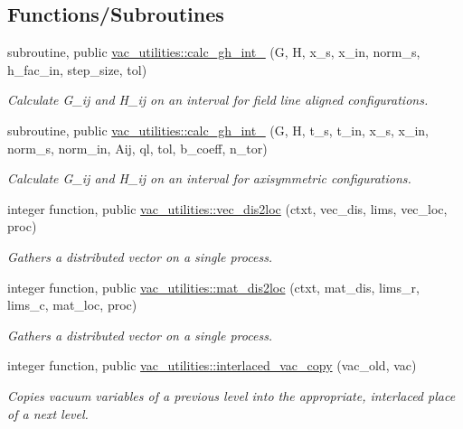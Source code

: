 \subsection*{Functions/\+Subroutines}
\begin{DoxyCompactItemize}
\item 
subroutine, public \hyperlink{namespacevac__utilities_aa8859980354d180445ed0437d7f51bcd}{vac\+\_\+utilities\+::calc\+\_\+gh\+\_\+int\+\_} (G, H, x\+\_\+s, x\+\_\+in, norm\+\_\+s, h\+\_\+fac\+\_\+in, step\+\_\+size, tol)
\begin{DoxyCompactList}\small\item\em Calculate G\+\_\+ij and H\+\_\+ij on an interval for field line aligned configurations. \end{DoxyCompactList}\item 
subroutine, public \hyperlink{namespacevac__utilities_af387fcaa54ec681e55d6eb685ad622bd}{vac\+\_\+utilities\+::calc\+\_\+gh\+\_\+int\+\_} (G, H, t\+\_\+s, t\+\_\+in, x\+\_\+s, x\+\_\+in, norm\+\_\+s, norm\+\_\+in, Aij, ql, tol, b\+\_\+coeff, n\+\_\+tor)
\begin{DoxyCompactList}\small\item\em Calculate G\+\_\+ij and H\+\_\+ij on an interval for axisymmetric configurations. \end{DoxyCompactList}\item 
integer function, public \hyperlink{namespacevac__utilities_a05e8e1f24569b4bff05e61a867268fc3}{vac\+\_\+utilities\+::vec\+\_\+dis2loc} (ctxt, vec\+\_\+dis, lims, vec\+\_\+loc, proc)
\begin{DoxyCompactList}\small\item\em Gathers a distributed vector on a single process. \end{DoxyCompactList}\item 
integer function, public \hyperlink{namespacevac__utilities_ae70e8a1fc132ba79a9a4f49f4944a352}{vac\+\_\+utilities\+::mat\+\_\+dis2loc} (ctxt, mat\+\_\+dis, lims\+\_\+r, lims\+\_\+c, mat\+\_\+loc, proc)
\begin{DoxyCompactList}\small\item\em Gathers a distributed vector on a single process. \end{DoxyCompactList}\item 
integer function, public \hyperlink{namespacevac__utilities_a8e7889688701f6ac2fd2c60cdee2b96a}{vac\+\_\+utilities\+::interlaced\+\_\+vac\+\_\+copy} (vac\+\_\+old, vac)
\begin{DoxyCompactList}\small\item\em Copies vacuum variables of a previous level into the appropriate, interlaced place of a next level. \end{DoxyCompactList}\end{DoxyCompactItemize}
